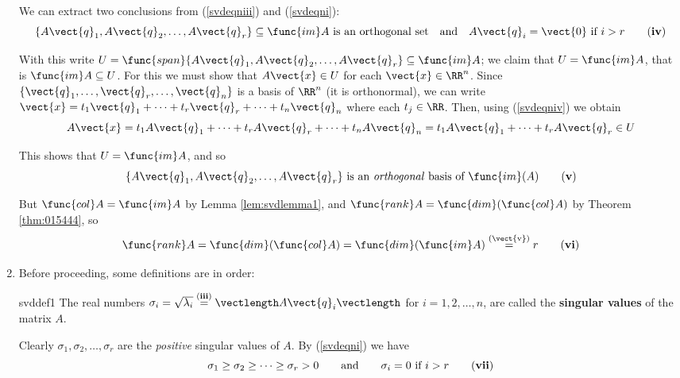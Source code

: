 \begin{enumerate}[label=\textbf{\arabic*.},leftmargin=*]
\noindent We can extract two conclusions from (\ref{svdeqniii}) and (\ref{svdeqni}): 
\begin{equation}\label{svdeqniv}
\{A\vect{q}_{1}, A\vect{q}_{2},\ldots ,A\vect{q}_{r}\}\subseteq \func{im} A \mbox{ is an orthogonal set}\quad \mbox{and} \quad A\vect{q}_{i}=\vect{0} \mbox{ if }i>r  \tag{\textbf{iv}}
\end{equation}

\noindent With this write $U=\func{span}\{A\vect{q}_{1}, A\vect{q}_{2},\ldots ,A\vect{q}_{r}\}\subseteq \func{im}A$; we claim that $U=\func{im}A$, that is $\func{im}A\subseteq U$. For this we must show
that $A\vect{x}\in U$ for each $\vect{x}\in \RR^{n}$. Since $\{\vect{q}_{1},\ldots ,\vect{q}_{r},\ldots ,\vect{q}_{n}\}$ is a basis
of $\RR^{n}$ (it is orthonormal), we can write $\vect{x}=t_{1}\vect{q}_{1}+\cdots +t_{r}\vect{q}_{r}+\cdots +t_{n}\vect{q}_{n}$ where each $t_{j}\in \RR$. Then, using (\ref{svdeqniv}) we
obtain
\begin{equation*}
A\vect{x}=t_{1}A\vect{q}_{1}+\cdots +t_{r}A\vect{q}_{r}+\cdots +t_{n}A\vect{q}_{n}=t_{1}A\vect{q}_{1}+\cdots +t_{r}A\vect{q}_{r}\in U
\end{equation*}

\noindent This shows that $U=\func{im}A$, and so 
\begin{equation}\label{svdeqnv}
\{A\vect{q}_{1}, A\vect{q}_{2},\ldots ,A\vect{q}_{r}\} \mbox{ is an \emph{orthogonal} basis of } \func{im}(A) \tag{\textbf{v}}
\end{equation}

\noindent But $\func{col}A=\func{im}A$ by Lemma \ref{lem:svdlemma1}, and $\func{rank}A=\func{dim}(\func{col}A)$ by Theorem \ref{thm:015444}, so
\begin{equation}\label{svdeqnvi}
\func{rank} A=\func{dim}(\func{col}A)=\func{dim}(\func{im}A)\overset{(\text{\vect{v}})}{=}r \tag{\textbf{vi}}
\end{equation}

\item Before proceeding, some definitions are in
order:

\begin{definition}{}{svddef1}
The real numbers $\sigma_{i}=\sqrt{\lambda_{i}}\overset{\text{(\textbf{iii})}}{=}\vectlength A\vect{q}_{i}\vectlength $ for $i=1,2,\ldots,n$, are called the \textbf{singular values} of the matrix $A$. 
\end{definition}

Clearly $\sigma_{1},\sigma_{2},\ldots ,\sigma_{r}$ are the \emph{positive}
singular values of $A$. By (\ref{svdeqni}) we have 
\begin{equation}\label{svdeqnvii}
\sigma_{1}\geq \sigma _{2}\geq \cdots \geq \sigma_{r}>0 \qquad \mbox{and} \qquad \sigma_{i}=0 \mbox{ if } i>r \tag{\textbf{vii}}
\end{equation}


\end{enumerate}
